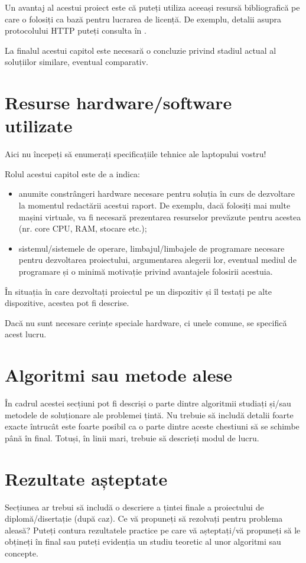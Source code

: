 \documentclass[12pt]{report}
\begin{document}
Un avantaj al acestui proiect este că puteți utiliza aceeași resursă bibliografică pe care o folosiți ca bază pentru lucrarea de licență. De exemplu, detalii asupra protocolului HTTP puteți consulta în \cite{misc:web:rfc7231}.

La finalul acestui capitol este necesară o concluzie privind stadiul actual al soluțiilor similare, eventual comparativ.

\section*{Resurse hardware/software utilizate}

Aici nu începeți să enumerați specificațiile tehnice ale laptopului vostru!

Rolul acestui capitol este de a indica:
\begin{itemize}
    \item anumite constrângeri hardware necesare pentru soluția în curs de dezvoltare la momentul redactării acestui raport. De exemplu, dacă folosiți mai multe mașini virtuale, va fi necesară prezentarea resurselor prevăzute pentru acestea (nr. core CPU, RAM, stocare etc.);
    \item sistemul/sistemele de operare, limbajul/limbajele de programare necesare pentru dezvoltarea proiectului, argumentarea alegerii lor, eventual mediul de programare și o minimă motivație privind avantajele folosirii acestuia.
\end{itemize}

În situația în care dezvoltați proiectul pe un dispozitiv și îl testați pe alte dispozitive, acestea pot fi descrise.

Dacă nu sunt necesare cerințe speciale hardware, ci unele comune, se specifică acest lucru.

\section*{Algoritmi sau metode alese}

În cadrul acestei secțiuni pot fi descriși o parte dintre algoritmii studiați și/sau metodele de soluționare ale problemei țintă. Nu trebuie să includă detalii foarte exacte întrucât este foarte posibil ca o parte dintre aceste chestiuni să se schimbe până în final. Totuși, în linii mari, trebuie să descrieți modul de lucru.

\section*{Rezultate așteptate}

Secțiunea ar trebui să includă o descriere a țintei finale a proiectului de diplomă/disertație (după caz). Ce vă propuneți să rezolvați pentru problema aleasă? Puteți contura rezultatele practice pe care vă așteptați/vă propuneți să le obțineți în final sau puteți evidenția un studiu teoretic al unor algoritmi sau concepte.

\nopagebreak


\end{document}
